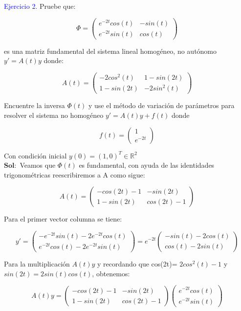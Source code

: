 \textcolor{blue}{Ejercicio 2.} Pruebe que:


$$\Phi= \begin{pmatrix}
e^{-2t}cos(t) & -sin(t)\\
e^{-2t}sin(t) & cos(t)
\end{pmatrix}$$

es una matriz fundamental del sistema lineal homogéneo, no autónomo $y'= A(t)y$ donde: 


$$A(t)= \begin{pmatrix}
-2 cos^2(t) & 1-sin(2t)\\
1-sin(2t) & -2sin^2(t) \end{pmatrix}$$

Encuentre la inversa $\Phi(t)$ y use el método de variación de parámetros para resolver el sistema no homogéneo $y'= A(t)y +f(t)$ donde 

$$f(t)=\begin{pmatrix}
1\\
e^{-2t}
\end{pmatrix}$$

Con condición inicial $y(0)= (1, 0)^T \in \mathbb{R}^2$\\

$\mathbf{Sol:}$ Veamos que $\Phi(t)$ es fundamental, con ayuda de las identidades trigonométricas reescribiremos a A como sigue:


$$A(t)= \begin{pmatrix}
-cos(2t)-1 & -sin(2t)\\
1-sin(2t) & cos(2t)-1
\end{pmatrix}$$

Para el primer vector columna se tiene:

$$y'= \begin{pmatrix}
-e^{-2t} sin(t) -2e^{-2t} cos(t)\\
e^{-2t}cos(t)- 2e^{-2t} sin(t)
\end{pmatrix} = e^{-2t}
\begin{pmatrix} -sin(t)- 2cos(t)\\
cos(t)- 2sin(t)
\end{pmatrix}$$
    
Para la multiplicación $A(t)y$ y recordando que cos(2t)= $2cos^2(t)-1$ y $sin(2t)= 2sin(t)cos(t)$, obtenemos:

$$A(t)y= \begin{pmatrix}
-cos(2t)-1 & -sin(2t)\\
1-sin(2t) & cos(2t)-1
\end{pmatrix}
\begin{pmatrix}
e^{-2t}cos(t)\\
e^{-2t}sin(t)
\end{pmatrix}$$
    

